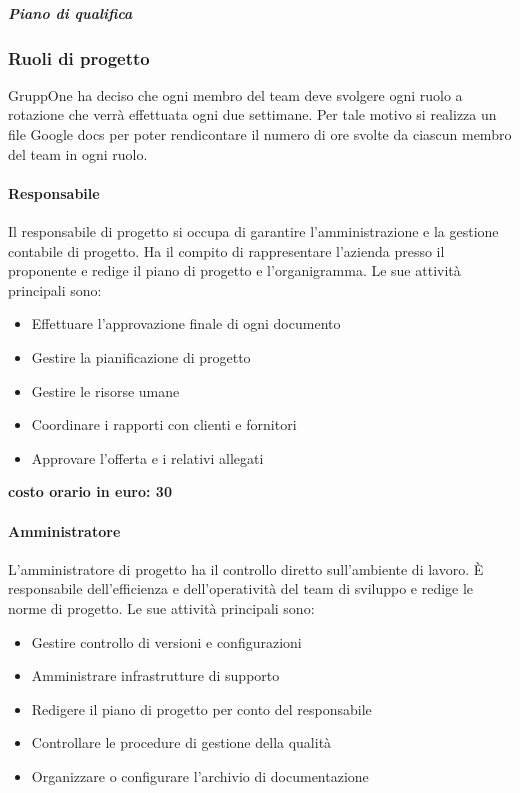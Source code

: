 \documentclass[../norme-di-progetto.tex]{subfiles}
\begin{document}
\subparagraph{Piano di qualifica}%
\label{subp:piano_di_qualifica}

\subsubsection{Ruoli di progetto}%
\label{subs:ruoli_di_progetto}

GruppOne ha deciso che ogni membro del team deve svolgere ogni ruolo a rotazione che verrà effettuata ogni due settimane.
Per tale motivo si realizza un file Google docs per poter rendicontare il numero di ore svolte da ciascun membro del team in ogni ruolo.

\paragraph{Responsabile}%
\label{par:responsabile}
Il responsabile di progetto si occupa di garantire l'amministrazione e la gestione contabile di progetto.
Ha il compito di rappresentare l'azienda presso il proponente e redige il piano di progetto e l'organigramma.
Le sue attività principali sono:

\begin{itemize}
  \item Effettuare l'approvazione finale di ogni documento
  \item Gestire la pianificazione di progetto
  \item Gestire le risorse umane
  \item Coordinare i rapporti con clienti e fornitori
  \item Approvare l'offerta e i relativi allegati
\end{itemize}

\textbf{costo orario in euro: 30}

\paragraph{Amministratore}%
\label{par:amministratore}
L'amministratore di progetto ha il controllo diretto sull'ambiente di lavoro. È responsabile dell'efficienza e dell'operatività del team di sviluppo e redige le norme di progetto. Le sue attività principali sono:

\begin{itemize}
  \item Gestire controllo di versioni e configurazioni
  \item Amministrare infrastrutture di supporto
  \item Redigere il piano di progetto per conto del responsabile
  \item Controllare le procedure di gestione della qualità
  \item Organizzare o configurare l'archivio di documentazione
\end{itemize}
\end{document}
